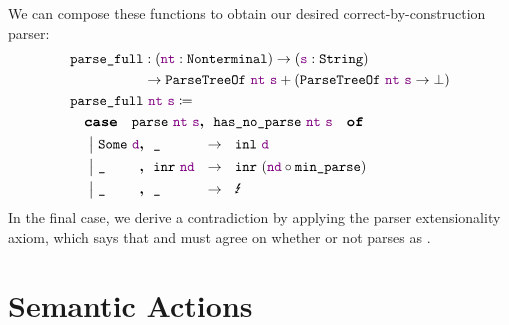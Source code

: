     We can compose these functions to obtain our desired correct-by-construction parser:
    \begin{align*}
      & \fname{parse\_full} \oftypesep (\oftype{\farg{nt}}{\Nonterminal}) \typeto (\oftype{\farg{s}}{\String}) \\
      & \phantom{\fname{parse\_full} }\typeto \typesum{\indname{ParseTreeOf}~\farg{nt}~\farg{s}}{\left(\indname{ParseTreeOf}~\farg{nt}~\farg{s}\typeto\False\right)} \\
      & \fname{parse\_full}~\farg{nt}~\farg{s} \defeq \\
      & \quad \caseof{\fname{parse}~\farg{nt}~\farg{s}\textbf{,}~~\fname{has\_no\_parse}~\farg{nt}~\farg{s}} \\
      & \quad \acase{\Some{\farg{d}}\textbf{,}~~\aswidthof{\termhole}{\inr{\farg{nd}}}}{\inl{\farg{d}}} \\
      & \quad \acase{\aswidthof{\termhole}{\Some{\farg{d}}}\textbf{,}~~\inr{\farg{nd}}}{\inrp{\farg{nd}\circ\fname{min\_parse}}} \\
      & \quad \acase{\aswidthof{\termhole}{\Some{\farg{d}}}\textbf{,}~~\aswidthof{\termhole}{\inr{\farg{nd}}}}{\text{\Lightning{}}}
    \end{align*}
    In the final case, we derive a contradiction by applying the parser extensionality axiom, which says that  and  must agree on whether or not  parses as .

\section{Semantic Actions} \label{sec:semantic-actions}

